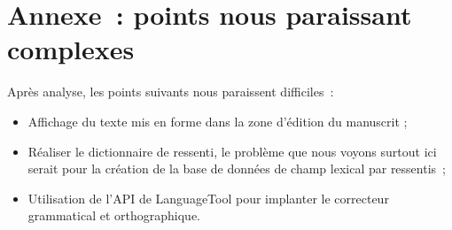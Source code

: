 \documentclass[a4paper,11pt,twoside]{article}
\begin{document}
\section*{Annexe~: points nous paraissant complexes}
Après analyse, les points suivants nous paraissent difficiles~:
\begin{itemize}
	\item Affichage du texte mis en forme dans la zone d'édition du manuscrit ;
    \item Réaliser le dictionnaire de ressenti, le problème que nous voyons surtout ici serait pour la création de la base de données de champ lexical par ressentis~;
    \item Utilisation de l'API de LanguageTool pour implanter le correcteur grammatical et orthographique.
\end{itemize}

\end{document}
